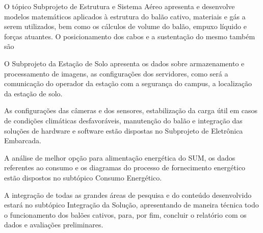   O tópico Subprojeto de Estrutura e Sistema Aéreo apresenta e desenvolve modelos matemáticos aplicados à estrutura do balão cativo, materiais e gás a serem utilizados, bem como os cálculos de volume do balão, empuxo líquido e forças atuantes. O posicionamento dos cabos e a sustentação do mesmo também são

  O Subprojeto da Estação de Solo apresenta os dados sobre armazenamento e processamento de imagens, as configurações dos servidores, como será a comunicação  do operador da estação com a segurança do campus, a localização da estação de solo.

  As configurações das câmeras e dos sensores, estabilização da carga útil em casos de condições climáticas desfavoráveis, manutenção do balão e integração das soluções de hardware e software estão dispostas no Subprojeto de Eletrônica Embarcada.

  A análise de melhor opção para alimentação energética do SUM, os dados referentes ao consumo e os diagramas do processo de fornecimento energético estão dispostos no subtópico Consumo Energético.

  A integração de todas as grandes áreas de pesquisa e do conteúdo desenvolvido estará no subtópico Integração da Solução, apresentando de maneira técnica todo o funcionamento dos balões cativos, para, por fim, concluir o relatório com os dados e avaliações preliminares.
